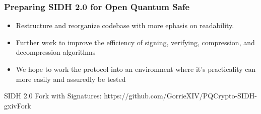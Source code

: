 \documentclass{beamer}
\begin{document}
\begin{frame}
\frametitle{Preparing SIDH 2.0 for Open Quantum Safe}
\begin{itemize}
\item Restructure and reorganize codebase with more ephasis on readability.
\item Further work to improve the efficiency of signing, verifying, compression, and decompression algorithms
\item We hope to work the protocol into an environment where it's practicality can more easily and assuredly be tested
\end{itemize}
\end{frame}

\begin{frame}
\begin{center}
SIDH 2.0 Fork with Signatures: https://github.com/GorrieXIV/PQCrypto-SIDH-gxivFork
\end{center}
\end{frame}
\end{document}
